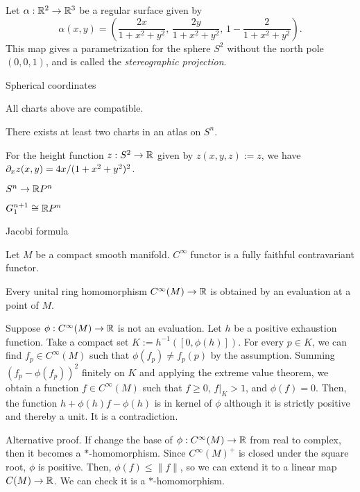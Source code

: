 \documentclass{../../large}
\renewcommand{\a}{\alpha}
\begin{document}
\begin{prb}[Spheres]
Let $\a:\R^2\to\R^3$ be a regular surface given by
\[\a(x,y)=\left(\frac{2x}{1+x^2+y^2},\,\frac{2y}{1+x^2+y^2},\,1-\frac2{1+x^2+y^2}\right).\]
This map gives a parametrization for the sphere $S^2$ without the north pole $(0,0,1)$, and is called the \emph{stereographic projection}.

Spherical coordinates
\begin{parts}
\item All charts above are compatible.
\item There exists at least two charts in an atlas on $S^n$.
\item For the height function $z:S^2\to\mathbb{R}$ given by $z(x,y,z):=z$, we have $\pd_xz(x,y)=4x/(1+x^2+y^2)^2$.
\end{parts}
\end{prb}

\begin{prb}
$S^n\to\mathbb{R} P^n$
\end{prb}
\begin{prb}
$G_1^{n+1}\cong\mathbb{R} P^n$
\end{prb}
\begin{prb}
\end{prb}
\begin{prb}
Jacobi formula
\end{prb}
\begin{prb}
Let $M$ be a compact smooth manifold.
$C^\infty$ functor is a fully faithful contravariant functor.
\begin{parts}
\item Every unital ring homomorphism $C^\infty(M)\to\mathbb{R}$ is obtained by an evaluation at a point of $M$.
\end{parts}
\end{prb}
\begin{pf}
Suppose $\phi:C^\infty(M)\to\mathbb{R}$ is not an evaluation.
Let $h$ be a positive exhaustion function.
Take a compact set $K:=h^{-1}([0,\phi(h)])$.
For every $p\in K$, we can find $f_p\in C^\infty(M)$ such that $\phi(f_p)\ne f_p(p)$ by the assumption.
Summing $(f_p-\phi(f_p))^2$ finitely on $K$ and applying the extreme value theorem, we obtain a function $f\in C^\infty(M)$ such that $f\ge0$, $f|_K>1$, and $\phi(f)=0$.
Then, the function $h+\phi(h)f-\phi(h)$ is in kernel of $\phi$ although it is strictly positive and thereby a unit.
It is a contradiction.

Alternative proof.
If change the base of $\phi:C^\infty(M)\to\mathbb{R}$ from real to complex, then it becomes a $*$-homomorphism.
Since $C^\infty(M)^+$ is closed under the square root, $\phi$ is positive.
Then, $\phi(f)\le\|f\|$, so we can extend it to a linear map $C(M)\to\mathbb{R}$.
We can check it is a $*$-homomorphism.
\end{pf}
\end{document}
